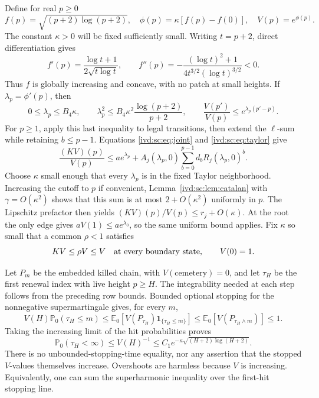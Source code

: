 \documentclass[11pt,letterpaper]{article}
\theoremstyle{remark}\newtheorem{remark}[theorem]{Remark}
\numberwithin{equation}{section}
\newcommand{\Prob}{\mathbb P}\newcommand{\E}{\mathbb E}
\begin{document}
Define for real $p\ge0$
\begin{equation}\label{ivd:sc:eq:barrier}
 f(p)=\sqrt{(p+2)\log(p+2)},\quad
 \phi(p)=\kappa[f(p)-f(0)],\quad V(p)=e^{\phi(p)}.
\end{equation}
The constant $\kappa>0$ will be fixed sufficiently small. Writing
$t=p+2$, direct differentiation gives
\[
 f'(p)=\frac{\log t+1}{2\sqrt{t\log t}},\qquad
 f''(p)=-\frac{(\log t)^2+1}{4t^{3/2}(\log t)^{3/2}}<0.
\]
Thus $f$ is globally increasing and concave, with no patch at small
heights. If $\lambda_p=\phi'(p)$, then
\begin{equation}\label{ivd:sc:eq:lambdabound}
 0\le\lambda_p\le B_4\kappa,\qquad
 \lambda_p^2\le B_4\kappa^2\frac{\log(p+2)}{p+2},\qquad
 \frac{V(p')}{V(p)}\le e^{\lambda_p(p'-p)}.
\end{equation}
For $p\ge1$, apply this last inequality to legal transitions, then
extend the $\ell$-sum while retaining $b\le p-1$. Equations
\eqref{ivd:sc:eq:joint} and \eqref{ivd:sc:eq:taylor} give
\[
 \frac{(KV)(p)}{V(p)}\le a e^{\lambda_p}
 +A_j(\lambda_p,0)\sum_{b=0}^{p-1}d_b R_j(\lambda_p,0)^b.
\]
Choose $\kappa$ small enough that every $\lambda_p$ is in the fixed
Taylor neighborhood. Increasing the cutoff to $p$ if convenient,
Lemma~\ref{ivd:sc:lem:catalan} with $\gamma=O(\kappa^2)$ shows that this
sum is at most $2+O(\kappa^2)$ uniformly in $p$. The Lipschitz
prefactor then yields $(KV)(p)/V(p)\le r_j+O(\kappa)$.
At the root the only edge gives $aV(1)\le a e^{\lambda_0}$, so the
same uniform bound applies. Fix $\kappa$ so small that a common
$\rho<1$ satisfies
\begin{equation}\label{ivd:sc:eq:superharmonic}
 KV\le\rho V\le V\quad\hbox{at every boundary state},\qquad V(0)=1.
\end{equation}

Let $P_m$ be the embedded killed chain, with $V(\text{cemetery})=0$,
and let $\tau_H$ be the first renewal index with live height $p\ge H$.
The integrability needed at each step follows from the preceding row
bounds. Bounded optional stopping for the nonnegative supermartingale
gives, for every $m$,
\[
 V(H)\Prob_0(\tau_H\le m)
 \le\E_0[V(P_{\tau_H})\mathbf1_{\{\tau_H\le m\}}]
 \le\E_0[V(P_{\tau_H\wedge m})]\le1.
\]
Taking the increasing limit of the hit probabilities proves
\begin{equation}\label{ivd:sc:eq:hit}
 \Prob_0(\tau_H<\infty)\le V(H)^{-1}
 \le C_1 e^{-\kappa\sqrt{(H+2)\log(H+2)}}.
\end{equation}
There is no unbounded-stopping-time equality, nor any assertion that the
stopped $V$-values themselves increase. Overshoots are harmless because
$V$ is increasing. Equivalently, one can sum the superharmonic inequality
over the first-hit stopping line.
\end{document}
